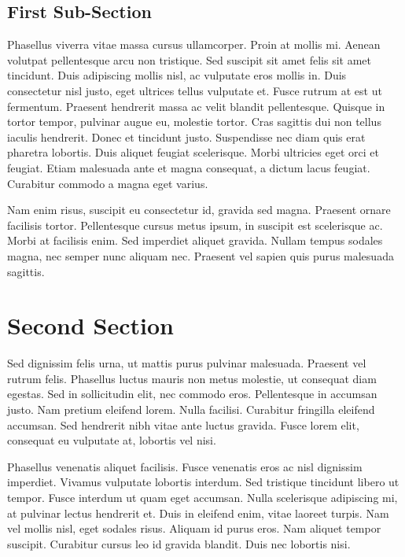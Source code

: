 \documentclass[openright]{book} %
\begin{document}
\subsection{First Sub-Section} %

Phasellus viverra vitae massa cursus ullamcorper. Proin at mollis mi. Aenean volutpat pellentesque arcu non tristique. Sed suscipit sit amet felis sit amet tincidunt. Duis adipiscing mollis nisl, ac vulputate eros mollis in. Duis consectetur nisl justo, eget ultrices tellus vulputate et. Fusce rutrum at est ut fermentum. Praesent hendrerit massa ac velit blandit pellentesque. Quisque in tortor tempor, pulvinar augue eu, molestie tortor. Cras sagittis dui non tellus iaculis hendrerit. Donec et tincidunt justo. Suspendisse nec diam quis erat pharetra lobortis. Duis aliquet feugiat scelerisque. Morbi ultricies eget orci et feugiat. Etiam malesuada ante et magna consequat, a dictum lacus feugiat. Curabitur commodo a magna eget varius.

Nam enim risus, suscipit eu consectetur id, gravida sed magna. Praesent ornare facilisis tortor. Pellentesque cursus metus ipsum, in suscipit est scelerisque ac. Morbi at facilisis enim. Sed imperdiet aliquet gravida. Nullam tempus sodales magna, nec semper nunc aliquam nec. Praesent vel sapien quis purus malesuada sagittis.

\section{Second Section} %

Sed dignissim felis urna, ut mattis purus pulvinar malesuada. Praesent vel rutrum felis. Phasellus luctus mauris non metus molestie, ut consequat diam egestas. Sed in sollicitudin elit, nec commodo eros. Pellentesque in accumsan justo. Nam pretium eleifend lorem. Nulla facilisi. Curabitur fringilla eleifend accumsan. Sed hendrerit nibh vitae ante luctus gravida. Fusce lorem elit, consequat eu vulputate at, lobortis vel nisi.

Phasellus venenatis aliquet facilisis. Fusce venenatis eros ac nisl dignissim imperdiet. Vivamus vulputate lobortis interdum. Sed tristique tincidunt libero ut tempor. Fusce interdum ut quam eget accumsan. Nulla scelerisque adipiscing mi, at pulvinar lectus hendrerit et. Duis in eleifend enim, vitae laoreet turpis. Nam vel mollis nisl, eget sodales risus. Aliquam id purus eros. Nam aliquet tempor suscipit. Curabitur cursus leo id gravida blandit. Duis nec lobortis nisi.
\end{document}
